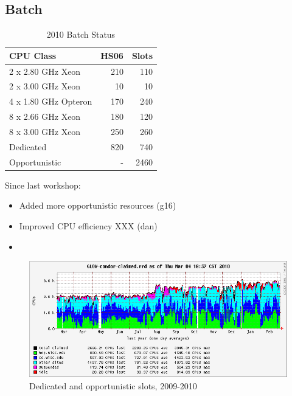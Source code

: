\documentclass{beamer}
\begin{document}
\subsection{Batch}
\begin{frame}
\begin{table}
\begin{tabular}{lrr}
	\toprule
	CPU Class							&	 HS06	 	&	 Slots \\
	\midrule
	2 x 2.80 GHz Xeon			&	 210		&	 110 \\	%
	2 x 3.00 GHz Xeon			&	 10			&	 10 \\	 %
	4 x 1.80 GHz Opteron	&	 170	 	&	 240 \\	%
	8 x 2.66 GHz Xeon			&	 180	 	&	 120 \\	%
	8 x 3.00 GHz Xeon			&	 250		&	 260 \\	%
	\midrule
	Dedicated							&	 820		&	 740 \\
	Opportunistic					&	 -			&	 2460 \\
	\bottomrule
\end{tabular}
\caption{2010 Batch Status}
\label{2010_batch_status}
\end{table}

Since last workshop:
\begin{itemize}
	\item Added more opportunistic resources (g16)
	\item Improved CPU efficiency XXX (dan)
	\item %
\end{itemize}
\end{frame}

\begin{frame}
\begin{figure}
	\includegraphics[width=\textwidth]{Graphics/GLOW-condor-claimed-1yr.png}
	\caption{Dedicated and opportunistic slots, 2009-2010}
\end{figure}
\end{frame}
\end{document}
